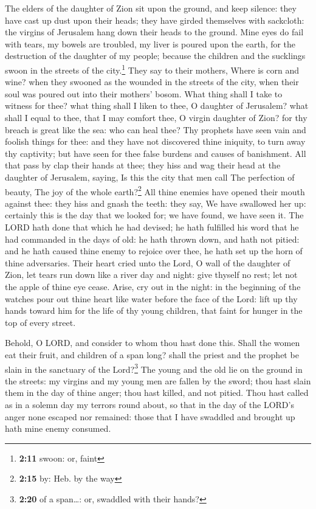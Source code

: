  The elders of the daughter of Zion sit upon the ground,
and keep silence: they have cast up dust upon their heads; they have
girded themselves with sackcloth: the virgins of Jerusalem hang down
their heads to the ground.  Mine eyes do fail with tears,
my bowels are troubled, my liver is poured upon the earth, for the
destruction of the daughter of my people; because the children and the
sucklings swoon in the streets of the city.\footnote{\textbf{2:11}
  swoon: or, faint}  They say to their mothers, Where is
corn and wine? when they swooned as the wounded in the streets of the
city, when their soul was poured out into their mothers' bosom.
 What thing shall I take to witness for thee? what thing
shall I liken to thee, O daughter of Jerusalem? what shall I equal to
thee, that I may comfort thee, O virgin daughter of Zion? for thy breach
is great like the sea: who can heal thee?  Thy prophets
have seen vain and foolish things for thee: and they have not discovered
thine iniquity, to turn away thy captivity; but have seen for thee false
burdens and causes of banishment.  All that pass by clap
their hands at thee; they hiss and wag their head at the daughter of
Jerusalem, saying, Is this the city that men call The perfection of
beauty, The joy of the whole earth?\footnote{\textbf{2:15} by: Heb. by
  the way}  All thine enemies have opened their mouth
against thee: they hiss and gnash the teeth: they say, We have swallowed
her up: certainly this is the day that we looked for; we have found, we
have seen it.  The LORD hath done that which he had
devised; he hath fulfilled his word that he had commanded in the days of
old: he hath thrown down, and hath not pitied: and he hath caused thine
enemy to rejoice over thee, he hath set up the horn of thine
adversaries.  Their heart cried unto the Lord, O wall of
the daughter of Zion, let tears run down like a river day and night:
give thyself no rest; let not the apple of thine eye cease.
 Arise, cry out in the night: in the beginning of the
watches pour out thine heart like water before the face of the Lord:
lift up thy hands toward him for the life of thy young children, that
faint for hunger in the top of every street.

 Behold, O LORD, and consider to whom thou hast done
this. Shall the women eat their fruit, and children of a span long?
shall the priest and the prophet be slain in the sanctuary of the
Lord?\footnote{\textbf{2:20} of a span\ldots: or, swaddled with their
  hands?}  The young and the old lie on the ground in the
streets: my virgins and my young men are fallen by the sword; thou hast
slain them in the day of thine anger; thou hast killed, and not pitied.
 Thou hast called as in a solemn day my terrors round
about, so that in the day of the LORD's anger none escaped nor remained:
those that I have swaddled and brought up hath mine enemy consumed.

